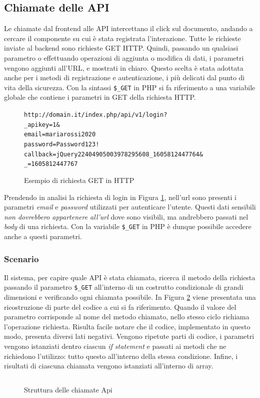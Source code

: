 \subsection{Chiamate delle API}
Le chiamate dal frontend alle API intercettano il click sul documento, andando a cercare il componente su cui è stata registrata l'interazione. Tutte le richieste inviate al backend sono richieste GET HTTP. Quindi, passando un qualsiasi parametro o effettuando operazioni di aggiunta o modifica di dati, i parametri vengono aggiunti all'URL, e mostrati in chiaro. Questo scelta è stata adottata anche per i metodi di registrazione e autenticazione, i più delicati dal punto di vita della sicurezza. Con la sintassi \texttt{\$\_GET} in PHP si fa riferimento a una variabile globale che contiene i parametri in GET della richiesta HTTP.
\begin{figure}[H]
\begin{alltt}
    \centering
    http://domain.it/index.php/api/v1/login?
    \centering
    _apikey=1&
    email=mariarossi2020%
    password=Password123!
    callback=jQuery22404905003978295608_1605812447764&
    _=1605812447767
\end{alltt}
\caption{Esempio di richiesta GET in HTTP}
\label{fig:getlogin}
\end{figure}
Prendendo in analisi la richiesta di login in Figura \ref{fig:getlogin}, nell'url sono presenti i parametri \textsl{email} e \textsl{password} utilizzati per autenticare l'utente. Questi dati sensibili \textit{non dovrebbero appartenere all'url} dove sono visibili, ma andrebbero passati nel \emph{body} di una richiesta. Con la variabile \texttt{\$\_GET} in PHP è dunque possibile accedere anche a questi parametri.

\subsubsection{Scenario}
Il sistema, per capire quale API è stata chiamata, ricerca il metodo della richiesta passando il parametro \texttt{\$\_GET} all'interno di un costrutto condizionale di grandi dimensioni e verificando ogni chiamata possibile. In Figura \ref{fig:apicall} viene presentata una ricostruzione di parte del codice a cui si fa riferimento. Quando il valore del parametro corrisponde al nome del metodo chiamato, nello stesso ciclo richiama l'operazione richiesta. Risulta facile notare che il codice, implementato in questo modo, presenta diversi lati negativi. Vengono ripetute parti di codice, i parametri vengono istanziati dentro ciascun \emph{if statement} e passati ai metodi che ne richiedono l'utilizzo: tutto questo all'interno della stessa condizione. Infine, i risultati di ciascuna chiamata vengono istanziati all'interno di array.
\begin{figure}
    \inputminted[firstline=2, lastline=15]{octave}{src/examples/old_api_call.php}
    \caption{Struttura delle chiamate Api}
    \label{fig:apicall}
\end{figure}

